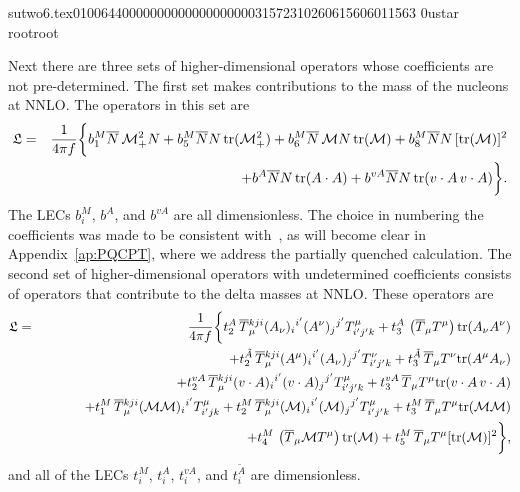                                                                                                                                                                                                                                                                                       sutwo6.tex                                                                                          0100644 0000000 0000000 00000315723 10260615606 011563  0                                                                                                    ustar   root                            root                                                                                                                                                                                                                   \documentclass[prd,amssymb,amsmath,showpacs,nofootinbib,superscriptaddress]{revtex4}
\begin{document}
Next there are three sets of higher-dimensional operators whose
coefficients are not pre-determined. The first set makes contributions
to the mass of the nucleons at NNLO. The operators in this set are
\begin{eqnarray}
	\mathfrak{L}  &=&
		\frac{1}{4 \pi f} \bigg\{
			b_1^M {\overline{N}}  \, \mathcal{M}_+^2  N
			+ b_5^M {\overline{N}} N \, \text{tr} ( \mathcal{M}_+^2 )
			+ b_6^M {\overline{N}} \, {\mathcal M} N \, \text{tr} ({\mathcal M}) 
			+ b_8^M {\overline{N}} N \, [\text{tr} ({\mathcal M})]^2 \notag \\
		&&\qquad\quad
		 	+ b^A {\overline{N}} N \, \text{tr} ( A \cdot A )  
			+ b^{vA} {\overline{N}} N \, \text{tr} ( v \cdot A \, v \cdot A ) 
		\bigg\}. \notag \\
\label{eq:NHDO} 
\end{eqnarray}
The LECs $b_i^M$, $b^A$, and $b^{vA}$ are all dimensionless. 
The choice in numbering the coefficients was made to be consistent
with~\cite{Walker-Loud:2004hf}, as will become clear in Appendix~\ref{ap:PQCPT}, where we 
address the partially quenched calculation.
The second set of higher-dimensional operators with undetermined coefficients 
consists of operators that contribute to the delta masses at NNLO. 
These operators are
\begin{eqnarray}\label{eq:DHDO}
	\mathfrak{L} &=& 
		\frac{1}{4 \pi f} \bigg\{
			t_2^A \, {\overline{T}} {}^{kji}_\mu (A_\nu)_{i}{}^{i'} (A^\nu)_{j}{}^{j'} T^\mu_{i'j'k} 
			+ t_3^A \, \left( {\overline{T}}_\mu T^\mu \right) \text{tr} ( A_\nu A^\nu ) \notag \\
		&&\qquad\quad
			+ t_2^{\tilde{A}} \, {\overline{T}} {}^{kji}_\mu (A^\mu)_{i}{}^{i'} (A_\nu)_{j}{}^{j'} T^\nu_{i'j'k} 
			+ t_3^{\tilde{A}} \, {\overline{T}}_\mu T^\nu \text{tr} ( A^\mu A_\nu ) \notag \\
		&&\qquad\quad
			+ t_2^{vA} \, {\overline{T}} {}^{kji}_\mu (v \cdot A)_{i}{}^{i'} (v \cdot A)_{j}{}^{j'} T^\mu_{i'j'k} 
			+ t_3^{vA} \, {\overline{T}}_\mu T^\mu  \text{tr} ( v \cdot A \, v \cdot A ) \notag \\
		&&\qquad\quad
			+ t_1^M \, {\overline{T}} {}^{kji}_\mu ({\mathcal M} {\mathcal M})_{i}{}^{i'} T^\mu_{i'jk} 
			+ t_2^M  \, {\overline{T}} {}^{kji}_\mu ({\mathcal M})_{i}{}^{i'} ({\mathcal M})_{j}{}^{j'} T^\mu_{i'j'k} 
			+ t_3^M  \, {\overline{T}}_\mu T^\mu \text{tr} ({\mathcal M} {\mathcal M}) \notag \\
		&&\qquad\quad
			+ t_4^M \, \left( {\overline{T}}_\mu {\mathcal M} T^\mu \right) \text{tr} ({\mathcal M})
			+ t_5^M  \, {\overline{T}}_\mu T^\mu  [ \text{tr}({\mathcal M}) ]^2
		\bigg\}
\label{eq:hdo},
\end{eqnarray}
and all of the LECs $t_i^M$, $t_i^A$, $t_i^{vA}$, and $t_i^{\tilde{A}}$ are dimensionless. 
\end{document}
